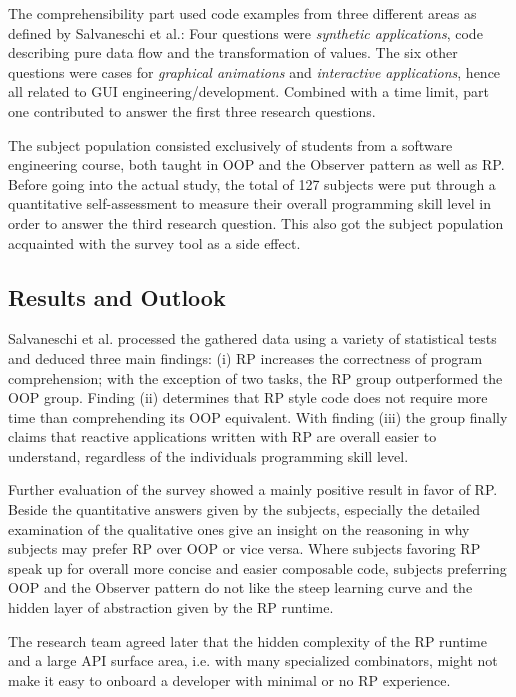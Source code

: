 \documentclass[12pt,a4paper]{article}
\begin{document}
The comprehensibility part used code examples from three different areas as defined by Salvaneschi et al.: Four questions were \emph{synthetic applications}, code describing pure data flow and the transformation of values. The six other questions were cases for \emph{graphical animations} and \emph{interactive applications}, hence all related to GUI engineering/development. Combined with a time limit, part one contributed to answer the first three research questions.

The subject population consisted exclusively of students from a software engineering course, both taught in OOP and the Observer pattern as well as RP. Before going into the actual study, the total of 127 subjects were put through a quantitative self-assessment to measure their overall programming skill level in order to answer the third research question. This also got the subject population acquainted with the survey tool as a side effect.

\subsection{Results and Outlook}

Salvaneschi et al. \cite{7827078} processed the gathered data using a variety of statistical tests and deduced three main findings: (i) RP increases the correctness of program comprehension; with the exception of two tasks, the RP group outperformed the OOP group. Finding (ii) determines that RP style code does not require more time than comprehending its OOP equivalent. With finding (iii) the group finally claims that reactive applications written with RP are overall easier to understand, regardless of the individuals programming skill level.

Further evaluation of the survey showed a mainly positive result in favor of RP. Beside the quantitative answers given by the subjects, especially the detailed examination of the qualitative ones give an insight on the reasoning in why subjects may prefer RP over OOP or vice versa. Where subjects favoring RP speak up for overall more concise and easier composable code, subjects preferring OOP and the Observer pattern do not like the steep learning curve and the hidden layer of abstraction given by the RP runtime.

The research team agreed later that the hidden complexity of the RP runtime and a large API surface area, i.e. with many specialized combinators, might not make it easy to onboard a developer with minimal or no RP experience.
\end{document}
